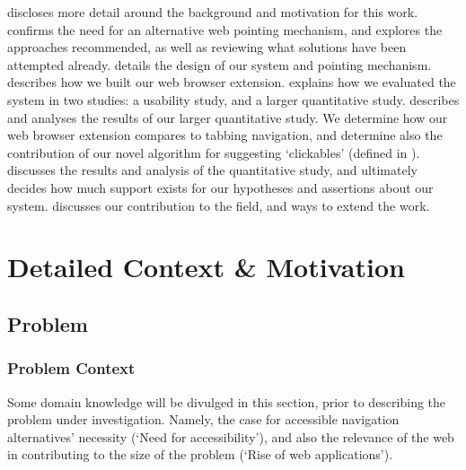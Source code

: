 \documentclass[11pt,openright,a4paper]{report}
\begin{document}
\begin{itemize}
 discloses more detail around the background and motivation for this work.
 confirms the need for an alternative web pointing mechanism, and explores the approaches recommended, as well as reviewing what solutions have been attempted already. %
 details the design of our system and pointing mechanism.
 describes how we built our web browser extension.
 explains how we evaluated the system in two studies: a usability study, and a larger quantitative study.
 describes and analyses the results of our larger quantitative study. We determine how our web browser extension compares to tabbing navigation, and determine also the contribution of our novel algorithm for suggesting `clickables' (defined in ).
 discusses the results and analysis of the quantitative study, and ultimately decides how much support exists for our hypotheses and assertions about our system.
 discusses our contribution to the field, and ways to extend the work.
\end{itemize}

\chapter{Detailed Context \& Motivation}
\label{chap:context}
\section{Problem}
\subsection{Problem Context}
Some domain knowledge will be divulged in this section, prior to describing the problem under investigation. Namely, the case for accessible navigation alternatives' necessity (`Need for accessibility'), and also the relevance of the web in contributing to the size of the problem (`Rise of web applications').
\end{document}
